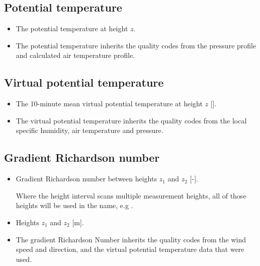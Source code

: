 \subsection{Potential temperature} 
\begin{itemize}
\item {} The potential temperature at height $z$.
\item {} The potential temperature inherits the quality codes from the pressure profile and calculated air temperature profile.
\end{itemize}

\subsection{Virtual potential temperature} 
\begin{itemize}
\item {} The 10-minute mean virtual potential temperature at height $z$ [\degree]. 
\item {} The virtual potential temperature inherits the quality codes from the local specific humidity, air temperature and pressure.
\end{itemize}

\subsection{Gradient Richardson number} 
\begin{itemize}
\item {} Gradient Richardson number between heights $z_1$ and $z_2$ [-].

Where the height interval scans multiple measurement heights, all of those heights will be used in the name, e.g .
\item {} Heights $z_1$ and $z_2$ [m]. 
\item {} The gradient Richardson Number inherits the quality codes from the wind speed and direction, and the virtual potential temperature data that were used.
\end{itemize}

